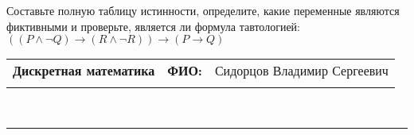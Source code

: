 \documentclass[10pt]{exam}
\newcommand{\class}{Дискретная математика}
\newcommand{\examdate}{}
\begin{document}
\begin{questions}
\begin{enumerate} [a)]
\end{enumerate}\question Составьте полную таблицу истинности, определите, какие переменные являются фиктивными и проверьте, является ли формула тавтологией:
$(( P \land \neg Q) \rightarrow (R \land \neg R)) \rightarrow (P \rightarrow Q)$

\end{questions}
\newpage
\begin{flushright}
\begin{tabular}{p{2.8in} r l}
\textbf{\class} & \textbf{ФИО:} &Сидорцов Владимир Сергеевич
\\

\textbf{\examdate} &&\\
\end{tabular}\\
\end{flushright}
\rule[1ex]{\textwidth}{.1pt}
\end{document}
